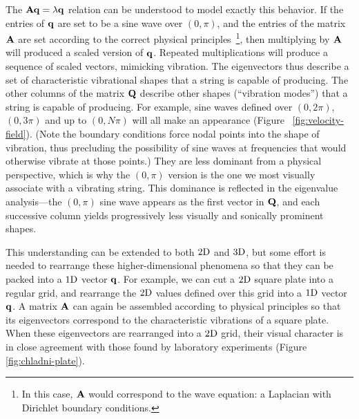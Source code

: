The $\mathbf{A} \mathbf{q} = \lambda \mathbf{q}$ relation can be understood to model exactly this behavior. If the entries of $\mathbf{q}$ are set to be a sine wave over $(0, \pi)$, and the entries of the matrix $\mathbf{A}$ are set according to the correct physical principles~\footnote{In this case, $\mathbf{A}$ would correspond to the wave equation: a Laplacian with Dirichlet boundary conditions.}, then multiplying by $\mathbf{A}$ will produced a scaled version of $\mathbf{q}$. Repeated multiplications will produce a sequence of scaled vectors, mimicking vibration. The eigenvectors thus describe a set of characteristic vibrational shapes that a string is capable of producing. The other columns of the matrix $\mathbf{Q}$ describe other shapes (``vibration modes'') that a string is capable of producing. For example, sine waves defined over $(0, 2\pi)$, $(0, 3\pi)$ and up to $(0, N \pi)$ will all make an appearance (Figure ~\ref{fig:velocity-field}). (Note the boundary conditions force nodal points into the shape of vibration, thus precluding the possibility of sine waves at frequencies that would otherwise vibrate at those points.) They are less dominant from a physical perspective, which is why the $(0, \pi)$ version is the one we most visually associate with a vibrating string. This dominance is reflected in the eigenvalue analysis---the $(0, \pi)$ sine wave appears as the first vector in $\mathbf{Q}$, and each successive column yields progressively less visually and sonically prominent shapes.

This understanding can be extended to both $2\textnormal{D}$ and $3\textnormal{D}$, but some effort is needed to rearrange these higher-dimensional phenomena so that they can be packed into a $1\textnormal{D}$ vector $\mathbf{q}$. For example, we can cut a $2\textnormal{D}$ square plate into a regular grid, and rearrange the $2\textnormal{D}$ values defined over this grid into a $1\textnormal{D}$ vector $\mathbf{q}$. A matrix $\mathbf{A}$ can again be assembled according to physical principles so that its eigenvectors correspond to the characteristic vibrations of a square plate. When these eigenvectors are rearranged into a $2\textnormal{D}$ grid, their visual character is in close agreement with those found by laboratory experiments (Figure \ref{fig:chladni-plate}).


